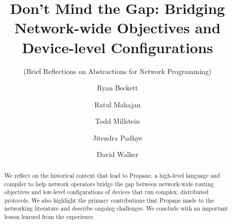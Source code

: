 \documentclass[sigconf]{acmart}
\newcommand{\sysname}{{\small \sf Propane}\xspace}
\begin{document}

\title{Don't Mind the Gap:  Bridging Network-wide Objectives and
  Device-level Configurations}

\subtitle{
  (Brief Reflections on Abstractions
  for Network Programming)
  }



\author{Ryan Beckett}

\author{Ratul Mahajan}

\author{Todd Millstein}

\author{Jitendra Padhye}
\author{David Walker}

\begin{abstract}
We reflect on the historical context that lead to 
\sysname,
a high-level language and compiler to help network operators
bridge the gap between network-wide routing objectives and low-level configurations of devices that run complex, distributed protocols.
We also highlight the primary contributions that Propane made to the
networking literature and describe ongoing challenges.
We conclude with an important lesson learned from the experience.
\end{abstract}


\end{document}
